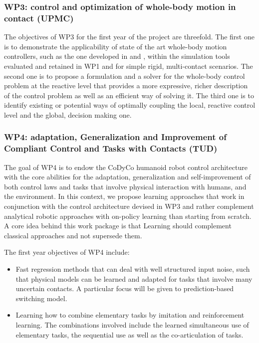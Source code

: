 \documentclass[12pt,a4paper,twoside]{article}
\begin{document}
\subsubsection{WP3: control and optimization of whole-body motion in contact (UPMC)}

The objectives of WP3 for the first year of the project are threefold. The first one is to demonstrate the applicability of state of the art whole-body motion controllers, such as the one developed in \cite{salini2012} and \cite{delprete2013}, within the simulation tools evaluated and retained in WP1 and for simple rigid, multi-contact scenarios. The second one is to propose a formulation and a solver for the whole-body control problem at the reactive level that provides a more expressive, richer description of the control problem as well as an efficient way of solving it. The third one is to identify existing or potential ways of optimally coupling the local, reactive control level and the global, decision making one.

\subsubsection{WP4: adaptation, Generalization and Improvement of Compliant Control and Tasks with Contacts (TUD)}

The goal of WP4 is to endow the CoDyCo humanoid robot control architecture with the core abilities for the
adaptation, generalization and self-improvement of both control laws and tasks that involve physical interaction
with humans, and the environment. In this context, we propose learning approaches that work in conjunction
with the control architecture devised in WP3 and rather complement analytical robotic approaches with on-policy
learning than starting from scratch. A core idea behind this work package is that Learning should complement
classical approaches and not supersede them.

The first year objectives of WP4 include:
\begin{itemize}
 \item Fast regression methods that can deal with well structured input noise, such that physical models can
be learned and adapted for tasks that involve many uncertain contacts. A particular focus will be given to
prediction-based switching model.
\item Learning how to combine elementary tasks by imitation and reinforcement learning. The combinations involved
include the learned simultaneous use of elementary tasks, the sequential use as well as the co-articulation of
tasks.
\end{itemize}
\end{document}
